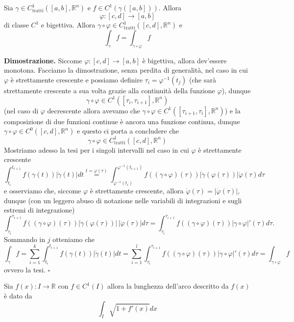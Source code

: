\vspace{0.5cm}
\begin{theorem}
	Sia $\gamma \in C^1_{\text{tratti}}([a, b], \mathbb{R}^n)$ e $f \in C^1(\gamma([a, b]))$. Allora 
	$$
		\varphi: [c, d] \to [a, b]
	$$
	di classe $C^1$ e bigettiva. Allora $\gamma \circ \varphi \in C^1_{\text{tratti}}([c,d], \mathbb{R}^n)$ e
	$$
		\int_{\gamma} f = \int_{\gamma \circ \varphi} f
	$$
\end{theorem}

\noindent \textbf{Dimostrazione. }
Siccome $\varphi: [c,d] \to [a,b]$ è bigettiva, allora dev'essere monotona. Facciamo la dimostrazione, senza perdita di generalità, nel caso in cui $\varphi$ è strettamente crescente
e possiamo definire $\tau_i = \varphi^{-1}(t_j)$ (che sarà strettamente crescente a sua volta grazie alla continuità della funzione $\varphi$), dunque
$$
\gamma \circ \varphi \in C^1([\tau_i, \tau_{i+1}], \mathbb{R}^n)
$$
(nel caso di $\varphi$ decrescente allora avevamo che $\gamma \circ \varphi \in C^1([\tau_{i+1}, \tau_{i}], \mathbb{R}^n)$) e la composizione di due funzioni continue è ancora una funzione continua, dunque
$\gamma \circ \varphi \in C^{0}([c, d], \mathbb{R}^n)$ e questo ci porta a concludere che
$$
\gamma \circ \varphi \in C^1_{\text{tratti}}([c, d], \mathbb{R}^n)
$$
Mostriamo adesso la tesi per i singoli intervalli nel caso in cui $\varphi$ è strettamente crescente
$$
\int_{t_i}^{t_{i+1}} f(\gamma(t))|\dot{\gamma}(t)|dt \stackrel{t = \varphi(\tau)}{=} \int_{\varphi^{-1}(t_{i})}^{\varphi^{-1}(t_{i+1})} f((\gamma \circ \varphi)(\tau))|\dot{\gamma}(\varphi(\tau))|\dot{\varphi}(\tau) d\tau
$$
\noindent e osserviamo che, siccome $\varphi$ è strettamente crescente, allora $\dot{\varphi}(\tau) = |\dot{\varphi}(\tau)|$, dunque (con un leggero abuso di notazione nelle variabili di integrazioni e sugli estremi di integrazione)
$$
\int_{\tau_i}^{\tau_{i+1}} f((\gamma \circ \varphi)(\tau))|\dot{\gamma}(\varphi(\tau))| \, |\dot{\varphi}(\tau)| d\tau = \int_{\tau_i}^{\tau_{i+1}} f( (\gamma \circ \varphi)(\tau) ) |\gamma \circ \varphi|'(\tau) d\tau.
$$
Sommando in $j$ otteniamo che
$$
\int_\gamma f = \sum_{i=1}^k \int_{t_i}^{t_{i+1}} f(\gamma(t))|\dot{\gamma}(t)|dt = \sum_{i=1}^l \int_{\tau_i}^{\tau_{i+1}} f((\gamma \circ \varphi)(\tau)) |\gamma \circ \varphi|'(\tau) d\tau = \int_{\gamma \circ \varphi} f 
$$
ovvero la tesi.
\hfill $\square$

\vspace{0.5cm}
\begin{cor}[\textcolor{blue}{lunghezza di un arco}]
	Sia $f(x): I \to \mathbb{R}$ con $f \in C^1(I)$ allora la lunghezza dell'arco descritto da $f(x)$ è dato da
	$$
		\int_I \sqrt{1 + f'(x)}dx
	$$
\end{cor}

